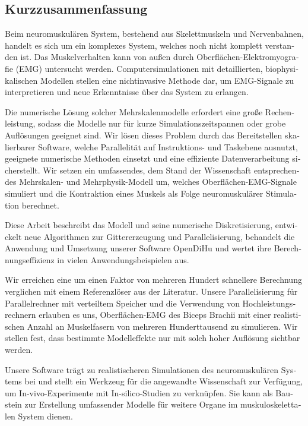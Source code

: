 \begin{otherlanguage}{ngerman}
  \section*{Kurzzusammenfassung}
   
  
Beim neuromuskulären System, bestehend aus Skelettmuskeln und Nervenbahnen, handelt es sich um ein komplexes System, welches noch nicht komplett verstanden ist. Das Muskelverhalten kann von außen durch Oberflächen-Elektromyografie (EMG) untersucht werden. Computersimulationen mit detaillierten, biophysikalischen Modellen stellen eine nichtinvasive Methode dar, um EMG-Signale zu interpretieren und neue Erkenntnisse über das System zu erlangen.

Die numerische Lösung solcher Mehrskalenmodelle erfordert eine große Rechenleistung, sodass die Modelle nur für kurze Simulationszeitspannen oder grobe Auflösungen geeignet sind. 
Wir lösen dieses Problem durch das Bereitstellen skalierbarer Software, welche Parallelität auf Instruktions- und Taskebene ausnutzt, geeignete numerische Methoden einsetzt und eine  effiziente Datenverarbeitung sicherstellt. Wir setzen ein umfassendes, dem Stand der Wissenschaft entsprechendes Mehrskalen- und Mehrphysik-Modell um, welches Oberflächen-EMG-Signale simuliert und die Kontraktion eines Muskels als Folge neuromuskulärer Stimulation berechnet.
  
Diese Arbeit beschreibt das Modell und seine numerische Diskretisierung, entwickelt neue Algorithmen zur Gittererzeugung und Parallelisierung, behandelt die Anwendung und Umsetzung unserer Software OpenDiHu und wertet ihre Berechnungseffizienz in vielen Anwendungsbeispielen aus.

Wir erreichen eine um einen Faktor von mehreren Hundert schnellere Berechnung verglichen mit einem Referenzlöser aus der Literatur. Unsere Parallelisierung für Parallelrechner mit verteiltem Speicher und die Verwendung von Hochleistungsrechnern erlauben es uns, Oberflächen-EMG des Biceps Brachii mit einer realistischen Anzahl an Muskelfasern von mehreren Hunderttausend zu simulieren. Wir stellen fest, dass bestimmte Modelleffekte nur mit solch hoher Auflösung sichtbar werden.

Unsere Software trägt zu realistischeren Simulationen des neuromuskulären Systems bei und stellt ein Werkzeug für die angewandte Wissenschaft zur Verfügung, um In-vivo-Experimente mit In-silico-Studien zu verknüpfen. Sie kann als Baustein zur Erstellung umfassender Modelle für weitere Organe im muskuloskelettalen System dienen.
  
\end{otherlanguage}

\cleardoublepage
